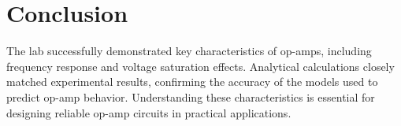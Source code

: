 \chapter{Conclusion}

The lab successfully demonstrated key characteristics of op-amps, including frequency response and voltage saturation effects. Analytical calculations closely matched experimental results, confirming the accuracy of the models used to predict op-amp behavior. Understanding these characteristics is essential for designing reliable op-amp circuits in practical applications.
